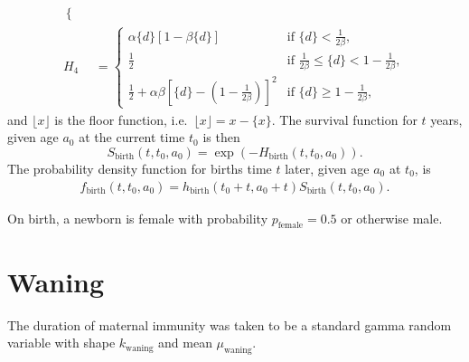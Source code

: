 \documentclass[12pt]{article}
\newcommand{\md}{\mathrm{d}}
\begin{document}
\begin{equation}
\begin{split}
\begin{cases}
    \end{cases}
    \\
    H_4 &=
    \begin{cases}
      \alpha \{d\} \left[1 - \beta \{d\}\right]
      & \text{if $\{d\} < \frac{1}{2 \beta}$},
      \\
      \frac{1}{2}
      & \text{if $\frac{1}{2 \beta} \leq \{d\} <
        1 - \frac{1}{2 \beta}$},
      \\
      \frac{1}{2}
      + \alpha \beta
      \left[\{d\} - \left(1 - \frac{1}{2 \beta}\right)\right]^2
      & \text{if $\{d\} \geq 1 - \frac{1}{2 \beta}$},
    \end{cases}
  \end{split}
\end{equation}
and $\lfloor x \rfloor$ is the floor function,
i.e.~$\lfloor x \rfloor = x - \{x\}$.
The survival function for $t$ years, given age
$a_0$ at the current time $t_0$ is then
\begin{equation}
  S_{\text{birth}}(t, t_0, a_0) = \exp\left(- H_{\text{birth}}(t, t_0, a_0)\right).
\end{equation}
The probability density function for births time $t$ later, given age
$a_0$ at $t_0$, is
\begin{align}
  f_{\text{birth}}(t, t_0, a_0) =
  h_{\text{birth}}(t_0 + t, a_0 + t)
  S_{\text{birth}}(t, t_0, a_0).
\end{align}


On birth, a newborn is female with probability
$p_{\text{female}} = 0.5$ or otherwise male.


\section{Waning}

The duration of maternal immunity was taken to be a standard gamma
random variable with shape $k_{\text{waning}}$
and mean $\mu_{\text{waning}}$.
\end{document}
